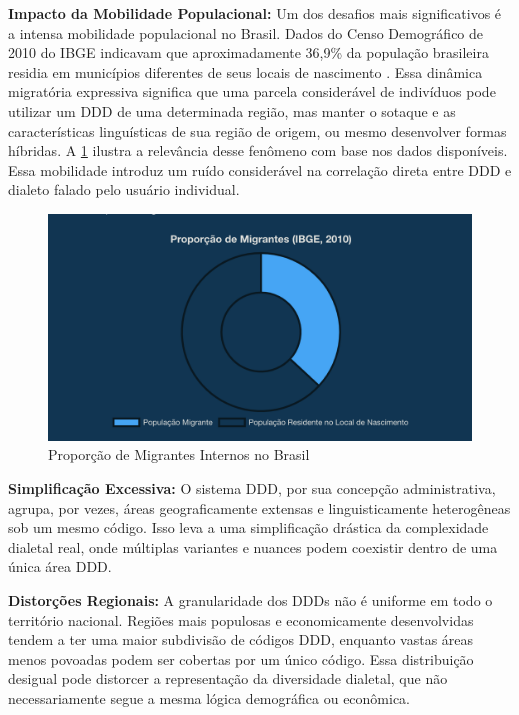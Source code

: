 \textbf{Impacto da Mobilidade Populacional:} Um dos desafios mais significativos é a intensa mobilidade populacional no Brasil. Dados do Censo Demográfico de 2010 do IBGE indicavam que aproximadamente 36,9\% da população brasileira residia em municípios diferentes de seus locais de nascimento \cite{noauthor_ibge_nodate}. Essa dinâmica migratória expressiva significa que uma parcela considerável de indivíduos pode utilizar um DDD de uma determinada região, mas manter o sotaque e as características linguísticas de sua região de origem, ou mesmo desenvolver formas híbridas. A \ref{fig:gradico-migracoes} ilustra a relevância desse fenômeno com base nos dados disponíveis. Essa mobilidade introduz um ruído considerável na correlação direta entre DDD e dialeto falado pelo usuário individual.


\begin{figure}
    \centering
    \includegraphics[width=0.8\linewidth]{images/grafico-dos-migrantes.png}
    \caption{Proporção de Migrantes Internos no Brasil}
    \label{fig:gradico-migracoes}
\end{figure}



\textbf{Simplificação Excessiva:} O sistema DDD, por sua concepção administrativa, agrupa, por vezes, áreas geograficamente extensas e linguisticamente heterogêneas sob um mesmo código. Isso leva a uma simplificação drástica da complexidade dialetal real, onde múltiplas variantes e nuances podem coexistir dentro de uma única área DDD.

\textbf{Distorções Regionais:} A granularidade dos DDDs não é uniforme em todo o território nacional. Regiões mais populosas e economicamente desenvolvidas tendem a ter uma maior subdivisão de códigos DDD, enquanto vastas áreas menos povoadas podem ser cobertas por um único código. Essa distribuição desigual pode distorcer a representação da diversidade dialetal, que não necessariamente segue a mesma lógica demográfica ou econômica.

